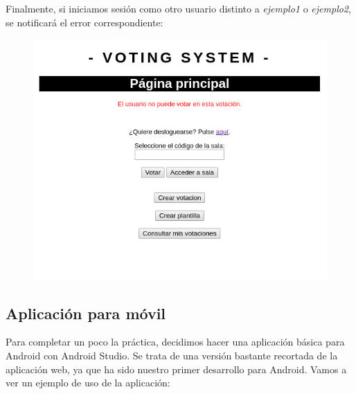 \documentclass{article}
\begin{document}
 
	 Finalmente, si iniciamos sesión como otro usuario distinto a \textit{ejemplo1} o \textit{ejemplo2}, se notificará el error correspondiente:
 	\begin{figure}[H]
 		\centering
 		\includegraphics[totalheight=8cm]{img/cap18}
 		\caption{}
 	\end{figure}
 
 	\subsection{Aplicación para móvil}
 	Para completar un poco la práctica, decidimos hacer una aplicación básica para Android con Android Studio. Se trata de una versión bastante recortada de la aplicación web, ya que ha sido nuestro primer desarrollo para Android.
 	Vamos a ver un ejemplo de uso de la aplicación:
 
\end{document}
